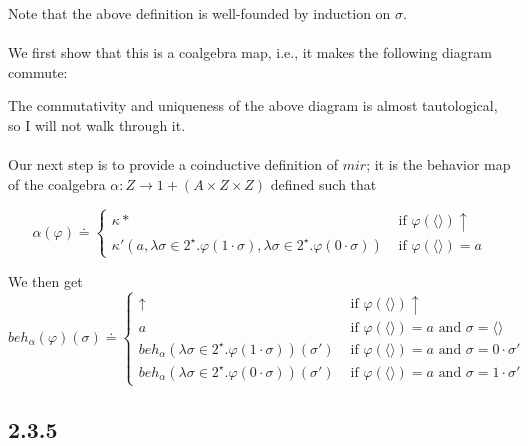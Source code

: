 \documentclass{article}
\begin{document}
Note that the above definition is well-founded by induction on $\sigma$.\\~\\
We first show that this is a coalgebra map, i.e., it makes the following diagram commute:

\begin{center}
\end{center}

The commutativity and uniqueness of the above diagram is almost tautological, so I will not walk through it.\\~\\
Our next step is to provide a coinductive definition of $\mathit{mir}$; it is the behavior map of the coalgebra
$\alpha : Z \to 1 + (A \times Z \times Z)$ defined such that

$$ \alpha(\varphi) \doteq \left \{
  \begin{array}{ll}
     \kappa \ast & \text{ if } \varphi(\langle \rangle) \uparrow \\
     \kappa' (a,\lambda \sigma \in 2^{\star}. \varphi(1 \cdot \sigma), \lambda \sigma \in 2^\star. \varphi(0 \cdot \sigma)) &
       \text{ if } \varphi(\langle \rangle) = a 
  \end{array}
  \right .
  $$

We then get 
$$\mathit{beh}_{\alpha}(\varphi)(\sigma) \doteq \left \{ 
 \begin{array}{ll}
   \uparrow & \text{ if } \varphi(\langle \rangle) \uparrow \\
   a & \text{ if } \varphi(\langle \rangle) = a \text{ and } \sigma = \langle \rangle \\
   \mathit{beh}_{\alpha}(\lambda \sigma \in 2^\star. \varphi(1 \cdot \sigma))(\sigma') & \text{ if } \varphi(\langle \rangle) = a \text{ and } \sigma = 0 \cdot \sigma' \\
  \mathit{beh}_{\alpha}(\lambda \sigma \in 2^\star. \varphi(0 \cdot \sigma))(\sigma') & \text{ if } \varphi(\langle \rangle) = a \text{ and } \sigma = 1 \cdot \sigma' 
 \end{array}
 \right .
$$

\subsection*{2.3.5}
\end{document}
